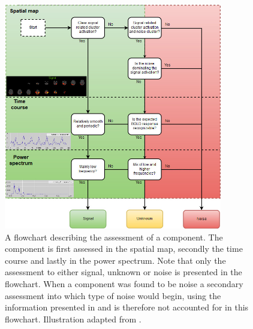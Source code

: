  \begin{figure}[H]                 
 	\includegraphics[width=0.85\textwidth]{figures/bMethods/Hand_labeling}  
 	\caption{A flowchart describing the assessment of a component. The component is first assessed in the spatial map, secondly the time course and lastly in the power spectrum. Note that only the assessment to either signal, unknown or noise is presented in the flowchart. When a component was found to be noise a secondary assessment into which type of noise would begin, using the information presented in \cite{Salimi-Khorshidi2014,Griffanti2017} and is therefore not accounted for in this flowchart. Illustration adapted from \cite{Griffanti2017}.}
 	\label{fig:hand_label} 
 \end{figure}
